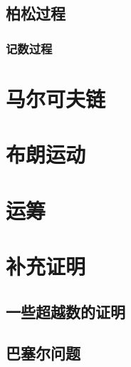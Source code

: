 \documentclass[cn,toc=twocol]{elegantbook}
\begin{document}
\section{柏松过程}

\subsection{记数过程}


\chapter{马尔可夫链}


\chapter{布朗运动}


\chapter{运筹}



\appendix
\chapter{补充证明}

\hypertarget{A1}{\section{一些超越数的证明}}

\hypertarget{A2}{\section{巴塞尔问题}}
\end{document}
